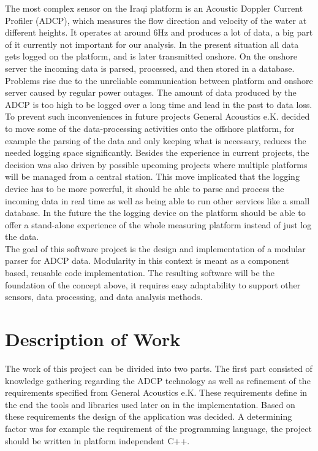 The most complex sensor on the Iraqi platform is an Acoustic Doppler Current Profiler (ADCP), which measures the flow direction and velocity of the water at different heights. It operates at around 6Hz and produces a lot of data, a big part of it currently not important for our analysis. In the present situation all data gets logged on the platform, and is later transmitted onshore. On the onshore server the incoming data is parsed, processed, and then stored in a database. Problems rise due to the unreliable communication between platform and onshore server caused by regular power outages. The amount of data produced by the ADCP is too high to be logged over a long time and lead in the past to data loss.\\\newline
To prevent such inconveniences in future projects General Acoustics e.K. decided to move some of the data-processing activities onto the offshore platform, for example the parsing of the data and only keeping what is necessary, reduces the needed logging space significantly. Besides the experience in current projects, the decision was also driven by possible upcoming projects where multiple platforms will be managed from a central station. This move implicated that the logging device has to be more powerful, it should be able to parse and process the incoming data in real time as well as being able to run other services like a small database. In the future the the logging device on the platform should be able to offer a stand-alone experience of the whole measuring platform instead of just log the data.\\\newline
The goal of this software project is the design and implementation of a modular parser for ADCP data. Modularity in this context is meant as a component based, reusable code implementation. The resulting software will be the foundation of the concept above, it requires easy adaptability to support other sensors, data processing, and data analysis methods. 

\section{Description of Work}
The work of this project can be divided into two parts. The first part consisted of knowledge gathering regarding the ADCP technology as well as refinement of the requirements specified from General Acoustics e.K. These requirements define in the end the tools and libraries used later on in the implementation. Based on these requirements the design of the application was decided. A determining factor was for example the requirement of the programming language, the project should be written in platform independent C++.

